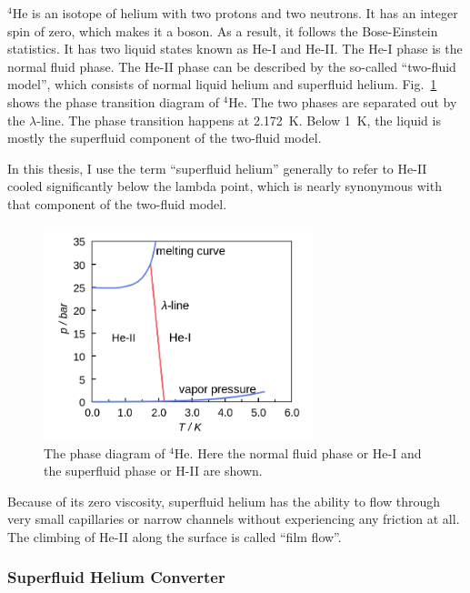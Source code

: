 $^4$He is an isotope of helium with two protons and two neutrons. It
has an integer spin of zero, which makes it a boson. As a result, it
follows the Bose-Einstein statistics. It has two liquid states known
as He-I and He-II. The He-I phase is the normal fluid phase. The He-II
phase can be described by the so-called ``two-fluid model'', which
consists of normal liquid helium and superfluid helium.
Fig.~\ref{fig:phasetransition} shows the phase transition diagram of
$^4$He. The two phases are separated out by the $\lambda$-line. The
phase transition happens at 2.172~K. Below 1~K, the liquid is mostly
the superfluid component of the two-fluid model.

In this thesis, I use the term ``superfluid helium'' generally to
refer to He-II cooled significantly below the lambda point, which is
nearly synonymous with that component of the two-fluid model.

\begin{figure}[h!]
  \centering \includegraphics[width=0.7\textwidth]{phasetransition.png}
  \caption[Phase diagram of $^4$He]{The phase diagram of $^4$He. Here
    the normal fluid phase or He-I and the superfluid phase or H-II
    are shown.}
\label{fig:phasetransition}
\end{figure}

Because of its zero viscosity, superfluid helium has the ability to
flow through very small capillaries or narrow channels without
experiencing any friction at all. The climbing of He-II along the
surface is called ``film flow''.


\subsubsection{Superfluid Helium Converter}

